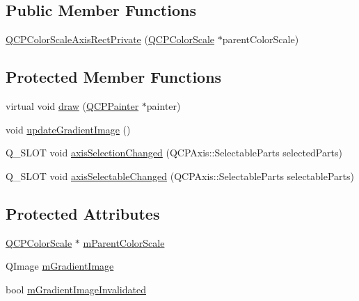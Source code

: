 \subsection*{Public Member Functions}
\begin{DoxyCompactItemize}
\item 
\hyperlink{classQCPColorScaleAxisRectPrivate_ad3b242f75dd2b33581364a4e668a80db}{Q\+C\+P\+Color\+Scale\+Axis\+Rect\+Private} (\hyperlink{classQCPColorScale}{Q\+C\+P\+Color\+Scale} $\ast$parent\+Color\+Scale)
\end{DoxyCompactItemize}
\subsection*{Protected Member Functions}
\begin{DoxyCompactItemize}
\item 
virtual void \hyperlink{classQCPColorScaleAxisRectPrivate_adb67bfe9057a9dd9a85f548c274e6d98}{draw} (\hyperlink{classQCPPainter}{Q\+C\+P\+Painter} $\ast$painter)
\item 
void \hyperlink{classQCPColorScaleAxisRectPrivate_a73754cab312aeaddea1bfcc67cc079ac}{update\+Gradient\+Image} ()
\item 
Q\+\_\+\+S\+L\+OT void \hyperlink{classQCPColorScaleAxisRectPrivate_a6112ad4291ac1695d37659cb049d598d}{axis\+Selection\+Changed} (Q\+C\+P\+Axis\+::\+Selectable\+Parts selected\+Parts)
\item 
Q\+\_\+\+S\+L\+OT void \hyperlink{classQCPColorScaleAxisRectPrivate_a66d2baed86966bb03a6d7c32dc7d59f7}{axis\+Selectable\+Changed} (Q\+C\+P\+Axis\+::\+Selectable\+Parts selectable\+Parts)
\end{DoxyCompactItemize}
\subsection*{Protected Attributes}
\begin{DoxyCompactItemize}
\item 
\hyperlink{classQCPColorScale}{Q\+C\+P\+Color\+Scale} $\ast$ \hyperlink{classQCPColorScaleAxisRectPrivate_a311c73f51a4cb0b556388197833cf099}{m\+Parent\+Color\+Scale}
\item 
Q\+Image \hyperlink{classQCPColorScaleAxisRectPrivate_ad4f7c8ee1c6012d9950870811773119c}{m\+Gradient\+Image}
\item 
bool \hyperlink{classQCPColorScaleAxisRectPrivate_a2c0b15b071e1f93006b48b5be022a631}{m\+Gradient\+Image\+Invalidated}
\end{DoxyCompactItemize}
